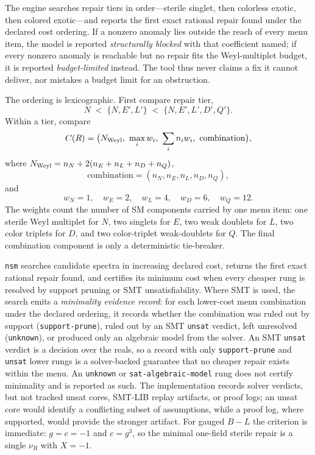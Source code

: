 \documentclass[11pt]{article}
\newcommand{\nsm}{\texttt{nsm}}
\begin{document}
The engine searches repair tiers in order---sterile singlet, then colorless
exotic, then colored exotic---and reports the first exact rational repair found
under the declared cost ordering. If a nonzero anomaly lies outside the reach of
every menu item, the model is reported \emph{structurally blocked} with that
coefficient named; if every nonzero anomaly is reachable but no repair fits the
Weyl-multiplet budget, it is reported \emph{budget-limited} instead. The tool
thus never claims a fix it cannot deliver, nor mistakes a budget limit for an
obstruction.

The ordering is lexicographic. First compare repair tier,
\[
N \;<\; \{N,E',L'\} \;<\; \{N,E',L',D',Q'\}.
\]
Within a tier, compare
\[
C(R)=\bigl(N_{\rm Weyl},\ \max_i w_i,\ \sum_i n_i w_i,\ \text{combination}\bigr),
\]
where $N_{\rm Weyl}=n_N+2(n_E+n_L+n_D+n_Q)$,
\[
\text{combination}=(n_N,n_E,n_L,n_D,n_Q),
\]
and
\[
w_N=1,\quad w_E=2,\quad w_L=4,\quad w_D=6,\quad w_Q=12 .
\]
The weights count the number of SM components carried by one menu item: one
sterile Weyl multiplet for $N$, two singlets for $E$, two weak doublets for $L$,
two color triplets for $D$, and two color-triplet weak-doublets for $Q$. The
final combination component is only a deterministic tie-breaker.

\nsm{} searches candidate spectra in increasing declared cost, returns the first
exact rational repair found, and certifies its minimum cost when every cheaper
rung is resolved by support pruning or SMT unsatisfiability. Where SMT is used,
the search emits a \emph{minimality evidence record}: for
each lower-cost menu combination under the declared ordering, it records whether
the combination was ruled out by support (\texttt{support-prune}), ruled out by an SMT \texttt{unsat}
verdict, left unresolved (\texttt{unknown}), or produced only an algebraic model
from the solver. An SMT \texttt{unsat} verdict is a decision over the reals, so a
record with only \texttt{support-prune} and \texttt{unsat} lower rungs is a
solver-backed guarantee that no cheaper repair exists within the menu. An
\texttt{unknown} or \texttt{sat-algebraic-model} rung does not certify
minimality and is reported as such. The implementation records solver verdicts, but not tracked
unsat cores, SMT-LIB replay artifacts, or proof logs; an unsat core would
identify a conflicting subset of assumptions, while a proof log, where supported,
would provide the stronger artifact. For gauged $B\!-\!L$ the criterion is
immediate: $g=c=-1$ and $c=g^3$, so the minimal one-field sterile repair is
a single $\nu_R$ with $X=-1$.
\end{document}
